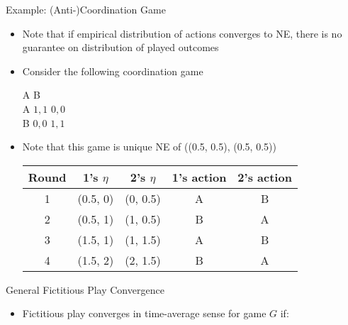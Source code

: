 \documentclass[11pt,aspectratio=169,handout]{beamer}
\begin{document}
  
  \begin{frame}{Example: (Anti-)Coordination Game}
   \begin{itemize}[<+->]
    \item Note that if empirical distribution of actions converges to NE, there is no guarantee on distribution of played outcomes
    \item Consider the following coordination game
    \begin{center}\scriptsize
     \hspace{-3.5em}
     \begin{game}{2}{2}
      	\> A		\> B		\\
      A	\> $1,1$	\> $0,0$	\\
      B	\> $0,0$	\> $1,1$
     \end{game}
    \end{center}
    \vspace{1em}
    \item Note that this game is unique NE of ((0.5, 0.5), (0.5, 0.5))
    \vspace{1em}
    \begin{center}
     \begin{tabular}{ccccc}
      Round	& 1's $\eta$	& 2's $\eta$	& 1's action	& 2's action			\\ \hline
      1		& (0.5, 0)	& (0, 0.5) 	& A			& B			\pause	\\
      2		& (0.5, 1)	& (1, 0.5) 	& B			& A			\pause	\\
      3		& (1.5, 1)	& (1, 1.5) 	& A			& B			\pause	\\
      4		& (1.5, 2)	& (2, 1.5) 	& B			& A					\\
     \end{tabular}
    \end{center}
   \end{itemize}
  \end{frame}  
  
  
  \begin{frame}{General Fictitious Play Convergence}
   \begin{itemize}[<+->]
   \setlength{\itemsep}{1.2em}
    \item Fictitious play converges in time-average sense for game $G$ if:
   \end{itemize}
  \end{frame}
  
\end{document}
